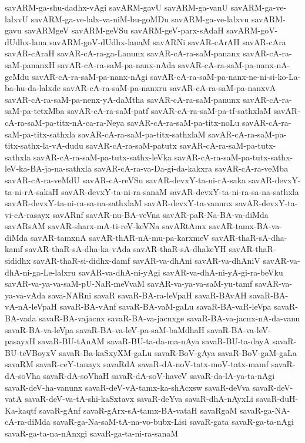 {savARM-ga-shu-dadhx-vAgi
savARM-gavU
savARM-ga-vanU
savARM-ga-ve-lalxvU
savARM-ga-ve-lalx-va-niM-bu-goMDu
savARM-ga-ve-lalxvu
savARM-gavu
savARMgeV
savARM-geVSu
savARM-geV-parx-sAdaH
savARM-goV-dUdhx-lana
savARM-goV-dUdhx-lanaM
savARNi
savAR-cArAH
savAR-cAra
savAR-cAraH
savAR-cA-ra-ga-Lanunx
savAR-cA-ra-saM-pananx
savAR-cA-ra-saM-pananxH
savAR-cA-ra-saM-pa-nanx-nAda
savAR-cA-ra-saM-pa-nanx-nA-geMdu
savAR-cA-ra-saM-pa-nanx-nAgi
savAR-cA-ra-saM-pa-nanx-ne-ni-si-ko-La-ba-hu-da-lalxde
savAR-cA-ra-saM-pa-nanxru
savAR-cA-ra-saM-pa-nanxvA
savAR-cA-ra-saM-pa-nenx-yA-daMtha
savAR-cA-ra-saM-panunx
savAR-cA-ra-saM-pa-tetxMba
savAR-cA-ra-saM-patf
savAR-cA-ra-saM-pa-tf-sathxlaM
savAR-cA-ra-saM-pa-titx-nA-ca-ra-Neya
savAR-cA-ra-saM-pa-titx-noLu
savAR-cA-ra-saM-pa-titx-sathxla
savAR-cA-ra-saM-pa-titx-sathxlaM
savAR-cA-ra-saM-pa-titx-sathx-la-vA-dudu
savAR-cA-ra-saM-patutx
savAR-cA-ra-saM-pa-tutx-sathxla
savAR-cA-ra-saM-pa-tutx-sathx-leVka
savAR-cA-ra-saM-pa-tutx-sathx-leV-ka-BA-ja-na-sathxla
savAR-cA-ra-va-Da-gi-da-kakxra
savAR-cA-ra-veMba
savAR-cA-ra-veMdU
savAR-cA-reVSu
savAR-devxY-ta-ni-rA-saka
savAR-devxY-ta-ni-rA-sakaH
savAR-devxY-ta-ni-ra-sanaM
savAR-devxY-ta-ni-ra-sa-na-sathxla
savAR-devxY-ta-ni-ra-sa-na-sathxlaM
savAR-devxY-ta-vanunx
savAR-devxY-ta-vi-cA-rasayx
savARnf
savAR-nu-BA-veVna
savAR-paR-Na-BA-va-diMda
savARsAM
savAR-sharx-mA-ti-reV-keVNa
savARtAmx
savAR-tamx-BA-va-diMda
savAR-tamxnA
savAR-thAR-nA-mu-pa-karxmeV
savAR-thaR-sA-dha-kamf
savAR-thaR-sA-dha-ka-vAda
savAR-thaR-sA-dhakeYH
savAR-thaR-sididhx
savAR-thaR-si-didhx-damf
savAR-va-dhAni
savAR-va-dhAniV
savAR-va-dhA-ni-ga-Le-lalxru
savAR-va-dhA-ni-yAgi
savAR-va-dhA-ni-yA-gi-ra-beVku
savAR-va-ya-va-saM-pU-NaR-meVvaM
savAR-va-ya-va-saM-yu-tamf
savAR-va-ya-va-vAda
sava-NARni
savaR
savaR-BA-ra-leVpaH
savaR-BAvAH
savaR-BA-vA-nA-leVpaH
savaR-BA-vAnf
savaR-BA-vaM-gaLu
savaR-BA-vaR-leVpa
savaR-BA-vada
savaR-BA-vajacnx
savaR-BA-va-jacnxge
savaR-BA-va-jacnx-nA-da-vanu
savaR-BA-va-leVpa
savaR-BA-va-leV-pa-saM-baMdhaH
savaR-BA-va-leV-pasayxH
savaR-BU-tAnAM
savaR-BU-ta-da-ma-nAya
savaR-BU-ta-dayA
savaR-BU-teVBoyxV
savaR-Ba-kaSxyXM-gaLu
savaR-BoV-gAya
savaR-BoV-gaM-gaLa
savaRM
savaR-ceY-tanayx
savaRdA
savaR-dA-noV-tatx-moV-tatx-mamf
savaR-dA-soVha
savaR-dA-soVhaH
savaR-dA-soV-haveV
savaR-da-lA-ya-ta-nAgi
savaR-deV-ha-vanunx
savaR-deV-vA-tamx-ka-shAcxsw
savaR-deVva
savaR-deV-vatA
savaR-deV-va-tA-shi-kaSxtavx
savaR-deYva
savaR-dhA-nAyxLi
savaR-duH-Ka-kaqtf
savaR-gAnf
savaR-gArx-sA-tamx-BA-vataH
savaRgaM
savaR-ga-NA-cA-ra-diMda
savaR-ga-Na-saM-tA-na-vo-bubx-Lisi
savaR-gata
savaR-ga-ta-nAgi
savaR-ga-ta-na-nAnxgi
savaR-ga-ta-ni-ra-sanaM
}
